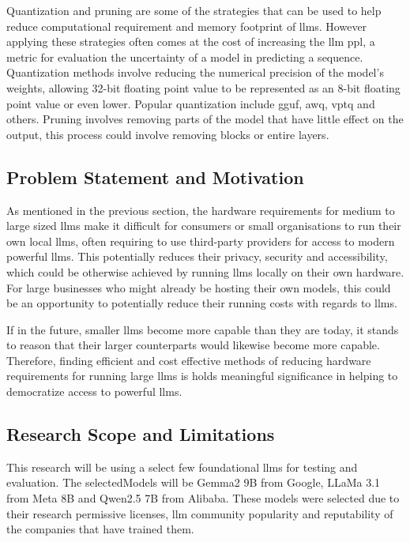 \documentclass{ifacconf}
\begin{document}
	Quantization and pruning are some of the strategies that can be used to help reduce computational requirement and memory footprint of \glspl{llm}. However applying these strategies often comes at the cost of increasing the \gls{llm} \gls{ppl}, a metric for evaluation the uncertainty of a model in predicting a sequence. Quantization methods involve reducing the numerical precision of the model's weights, allowing 32-bit floating point value to be represented as an 8-bit floating point value or even lower. Popular quantization include \gls{gguf}\cite{llamacpp, ggml}, \gls{awq}\cite{lin2024awqactivationawareweightquantization}, \gls{vptq}\cite{liu2024vptqextremelowbitvector} and others. Pruning involves removing parts of the model that have little effect on the output, this process could involve removing blocks or entire layers.
	
	\subsection{Problem Statement and Motivation}
	
	As mentioned in the previous section, the hardware requirements for medium to large sized  \glspl{llm} make it difficult for consumers or small organisations to run their own local  \glspl{llm}, often requiring to use third-party providers for access to modern powerful  \glspl{llm}. This potentially reduces their privacy, security and accessibility, which could be otherwise achieved by running  \glspl{llm} locally on their own hardware. For large businesses who might already be hosting their own models, this could be an opportunity to potentially reduce their running costs with regards to \glspl{llm}.
	
	If in the future, smaller \glspl{llm} become more capable than they are today, it stands to reason that their larger counterparts would likewise become more capable. Therefore, finding efficient and cost effective methods of reducing hardware requirements for running large \glspl{llm} is holds meaningful significance in helping to democratize access to powerful \glspl{llm}.
	
	\subsection{Research Scope and Limitations}
	This research will be using a select few foundational \glspl{llm} for testing and evaluation. The \gls{selectedModels} will be Gemma2 9B from Google\cite{gemmateam2024gemma2improvingopen}, LLaMa 3.1 from Meta 8B \cite{dubey2024llama3herdmodels} and Qwen2.5 7B from Alibaba\cite{qwen2.5}. These models were selected due to their research permissive licenses, \gls{llm} community popularity and reputability of the companies that have trained them.
	
\end{document}

